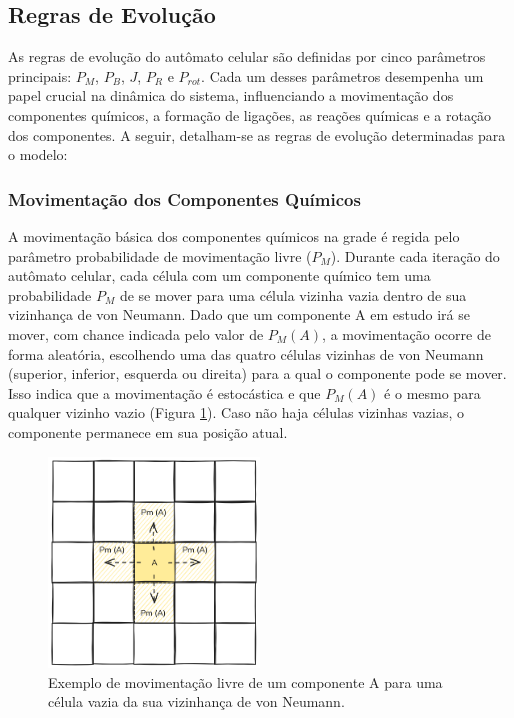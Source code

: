 \documentclass[12pt,oneside]{report}
\begin{document}
\subsection{Regras de Evolução}

As regras de evolução do autômato celular são definidas por cinco parâmetros principais: \hyperref[subsubsec:Pm]{$P_M$}, \hyperref[subsubsec:Pb]{$P_B$}, \hyperref[subsubsec:J]{$J$}, \hyperref[subsubsec:Pr]{$P_R$} e \hyperref[subsubsec:Prot]{$P_{rot}$}. Cada um desses parâmetros desempenha um papel crucial na dinâmica do sistema, influenciando a movimentação dos componentes químicos, a formação de ligações, as reações químicas e a rotação dos componentes. A seguir, detalham-se as regras de evolução determinadas para o modelo:

\subsubsection{Movimentação dos Componentes Químicos}
\label{subsubsec:evolucao_movimentacao}

A movimentação básica dos componentes químicos na grade é regida pelo parâmetro probabilidade de movimentação livre (\hyperref[subsubsec:Pm]{$P_M$}). Durante cada iteração do autômato celular, cada célula com um componente químico tem uma probabilidade $P_M$ de se mover para uma célula vizinha vazia dentro de sua vizinhança de von Neumann. Dado que um componente A em estudo irá se mover, com chance indicada pelo valor de $P_M (A)$, a movimentação ocorre de forma aleatória, escolhendo uma das quatro células vizinhas de von Neumann (superior, inferior, esquerda ou direita) para a qual o componente pode se mover. Isso indica que a movimentação é estocástica e que $P_M (A)$ é o mesmo para qualquer vizinho vazio (Figura \ref{fig:evolucao_Pm}). Caso não haja células vizinhas vazias, o componente permanece em sua posição atual.

\begin{figure}[H]
    \centering
    \includegraphics[width=0.5\textwidth]{img/evolucao_Pm.png}
    \caption{\small Exemplo de movimentação livre de um componente A para uma célula vazia da sua vizinhança de von Neumann.}
    \label{fig:evolucao_Pm}
\end{figure}
\end{document}
